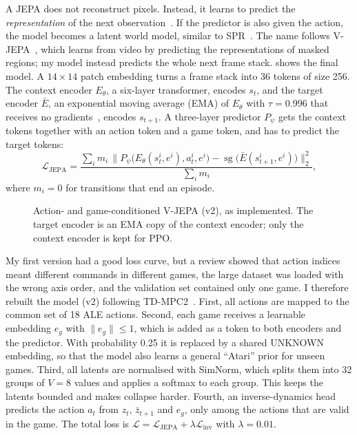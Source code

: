 \documentclass[runningheads]{llncs}
\begin{document}
A JEPA does not reconstruct pixels. Instead, it learns to predict the \emph{representation}
of the next observation~\cite{lecun2022path}. If the predictor is also given the action, the
model becomes a latent world model, similar to SPR~\cite{schwarzer2021spr}. The name follows
V-JEPA~\cite{bardes2024vjepa}, which learns from video by predicting the representations of
masked regions; my model instead predicts the whole next frame stack. 
shows the final model. A $14\times14$ patch embedding turns a frame stack into 36 tokens of
size 256. The context encoder $E_\theta$, a six-layer transformer, encodes $s_t$, and the
target encoder $\bar E$, an exponential moving average (EMA) of $E_\theta$ with $\tau=0.996$
that receives no gradients~\cite{assran2023ijepa}, encodes $s_{t+1}$. A three-layer predictor
$P_\psi$ gets the context tokens together with an action token and a game token, and has to
predict the target tokens:
\begin{equation}
  \mathcal{L}_{\text{JEPA}}=\frac{\sum_i m_i\,\big\|P_\psi\big(E_\theta(s_t^i,e^i),a_t^i,e^i\big)
  -\operatorname{sg}\big(\bar E(s_{t+1}^i,e^i)\big)\big\|_2^2}{\sum_i m_i},
\end{equation}
where $m_i=0$ for transitions that end an episode.

\begin{figure}[!htbp]
\centering

\caption{Action- and game-conditioned V-JEPA (v2), as implemented. The target
encoder is an EMA copy of the context encoder; only the context encoder is kept for PPO.}
\label{fig:jepa}
\end{figure}

My first version had a good loss curve, but a review showed that action indices meant
different commands in different games, the large dataset was loaded with the wrong axis order,
and the validation set contained only one game.
I therefore rebuilt the model (v2) following TD-MPC2~\cite{hansen2024tdmpc2}. First, all actions are mapped to the common set of 18 ALE actions. Second, each game
receives a learnable embedding $e_g$ with $\|e_g\|\le1$, which is added as a token to both
encoders and the predictor. With probability 0.25 it is replaced by a shared UNKNOWN
embedding, so that the model also learns a general ``Atari'' prior for unseen games. Third, all
latents are normalised with SimNorm, which splits them into 32 groups of $V=8$ values and
applies a softmax to each group. This keeps the latents bounded and makes collapse harder. Fourth,
an inverse-dynamics head~\cite{pathak2017icm} predicts the action $a_t$ from $z_t$,
$\bar z_{t+1}$ and $e_g$, only among the actions that are valid in the game. The total loss is
$\mathcal{L}=\mathcal{L}_{\text{JEPA}}+\lambda\mathcal{L}_{\text{inv}}$ with $\lambda=0.01$.
\end{document}
